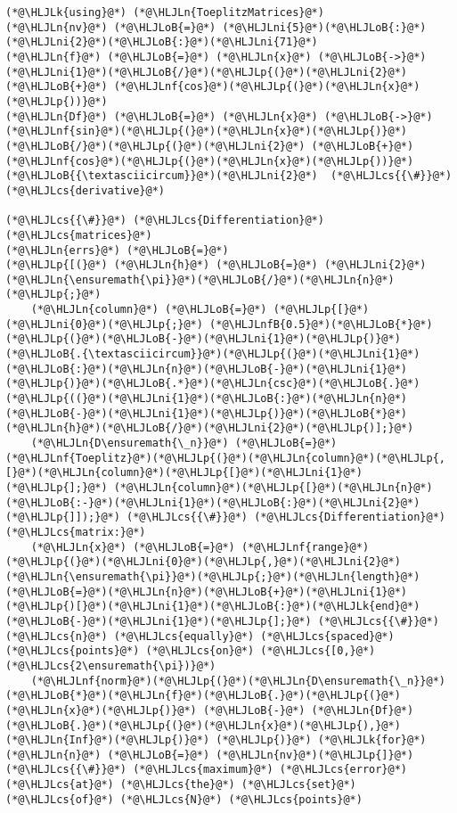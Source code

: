 \documentclass[12pt,a4paper]{article}
\newcommand{\HLJLk}[1]{\textcolor[RGB]{148,91,176}{\textbf{#1}}}
\newcommand{\HLJLn}[1]{#1}
\newcommand{\HLJLnf}[1]{\textcolor[RGB]{66,102,213}{#1}}
\newcommand{\HLJLnfB}[1]{\textcolor[RGB]{59,151,46}{#1}}
\newcommand{\HLJLni}[1]{\textcolor[RGB]{59,151,46}{#1}}
\newcommand{\HLJLoB}[1]{\textcolor[RGB]{102,102,102}{\textbf{#1}}}
\newcommand{\HLJLp}[1]{#1}
\newcommand{\HLJLcs}[1]{\textcolor[RGB]{153,153,119}{\textit{#1}}}
\begin{document}
\begin{lstlisting}
(*@\HLJLk{using}@*) (*@\HLJLn{ToeplitzMatrices}@*)
(*@\HLJLn{nv}@*) (*@\HLJLoB{=}@*) (*@\HLJLni{5}@*)(*@\HLJLoB{:}@*)(*@\HLJLni{2}@*)(*@\HLJLoB{:}@*)(*@\HLJLni{71}@*)
(*@\HLJLn{f}@*) (*@\HLJLoB{=}@*) (*@\HLJLn{x}@*) (*@\HLJLoB{->}@*) (*@\HLJLni{1}@*)(*@\HLJLoB{/}@*)(*@\HLJLp{(}@*)(*@\HLJLni{2}@*) (*@\HLJLoB{+}@*) (*@\HLJLnf{cos}@*)(*@\HLJLp{(}@*)(*@\HLJLn{x}@*)(*@\HLJLp{))}@*)
(*@\HLJLn{Df}@*) (*@\HLJLoB{=}@*) (*@\HLJLn{x}@*) (*@\HLJLoB{->}@*) (*@\HLJLnf{sin}@*)(*@\HLJLp{(}@*)(*@\HLJLn{x}@*)(*@\HLJLp{)}@*)(*@\HLJLoB{/}@*)(*@\HLJLp{(}@*)(*@\HLJLni{2}@*) (*@\HLJLoB{+}@*) (*@\HLJLnf{cos}@*)(*@\HLJLp{(}@*)(*@\HLJLn{x}@*)(*@\HLJLp{))}@*)(*@\HLJLoB{{\textasciicircum}}@*)(*@\HLJLni{2}@*)  (*@\HLJLcs{{\#}}@*) (*@\HLJLcs{derivative}@*)

(*@\HLJLcs{{\#}}@*) (*@\HLJLcs{Differentiation}@*) (*@\HLJLcs{matrices}@*)
(*@\HLJLn{errs}@*) (*@\HLJLoB{=}@*) 
(*@\HLJLp{[(}@*) (*@\HLJLn{h}@*) (*@\HLJLoB{=}@*) (*@\HLJLni{2}@*)(*@\HLJLn{\ensuremath{\pi}}@*)(*@\HLJLoB{/}@*)(*@\HLJLn{n}@*)(*@\HLJLp{;}@*)
    (*@\HLJLn{column}@*) (*@\HLJLoB{=}@*) (*@\HLJLp{[}@*)(*@\HLJLni{0}@*)(*@\HLJLp{;}@*) (*@\HLJLnfB{0.5}@*)(*@\HLJLoB{*}@*)(*@\HLJLp{(}@*)(*@\HLJLoB{-}@*)(*@\HLJLni{1}@*)(*@\HLJLp{)}@*)(*@\HLJLoB{.{\textasciicircum}}@*)(*@\HLJLp{(}@*)(*@\HLJLni{1}@*)(*@\HLJLoB{:}@*)(*@\HLJLn{n}@*)(*@\HLJLoB{-}@*)(*@\HLJLni{1}@*)(*@\HLJLp{)}@*)(*@\HLJLoB{.*}@*)(*@\HLJLn{csc}@*)(*@\HLJLoB{.}@*)(*@\HLJLp{((}@*)(*@\HLJLni{1}@*)(*@\HLJLoB{:}@*)(*@\HLJLn{n}@*)(*@\HLJLoB{-}@*)(*@\HLJLni{1}@*)(*@\HLJLp{)}@*)(*@\HLJLoB{*}@*)(*@\HLJLn{h}@*)(*@\HLJLoB{/}@*)(*@\HLJLni{2}@*)(*@\HLJLp{)];}@*)
    (*@\HLJLn{D\ensuremath{\_n}}@*) (*@\HLJLoB{=}@*) (*@\HLJLnf{Toeplitz}@*)(*@\HLJLp{(}@*)(*@\HLJLn{column}@*)(*@\HLJLp{,[}@*)(*@\HLJLn{column}@*)(*@\HLJLp{[}@*)(*@\HLJLni{1}@*)(*@\HLJLp{];}@*) (*@\HLJLn{column}@*)(*@\HLJLp{[}@*)(*@\HLJLn{n}@*)(*@\HLJLoB{:-}@*)(*@\HLJLni{1}@*)(*@\HLJLoB{:}@*)(*@\HLJLni{2}@*)(*@\HLJLp{]]);}@*) (*@\HLJLcs{{\#}}@*) (*@\HLJLcs{Differentiation}@*) (*@\HLJLcs{matrix:}@*)
    (*@\HLJLn{x}@*) (*@\HLJLoB{=}@*) (*@\HLJLnf{range}@*)(*@\HLJLp{(}@*)(*@\HLJLni{0}@*)(*@\HLJLp{,}@*)(*@\HLJLni{2}@*)(*@\HLJLn{\ensuremath{\pi}}@*)(*@\HLJLp{;}@*)(*@\HLJLn{length}@*)(*@\HLJLoB{=}@*)(*@\HLJLn{n}@*)(*@\HLJLoB{+}@*)(*@\HLJLni{1}@*)(*@\HLJLp{)[}@*)(*@\HLJLni{1}@*)(*@\HLJLoB{:}@*)(*@\HLJLk{end}@*)(*@\HLJLoB{-}@*)(*@\HLJLni{1}@*)(*@\HLJLp{];}@*) (*@\HLJLcs{{\#}}@*) (*@\HLJLcs{n}@*) (*@\HLJLcs{equally}@*) (*@\HLJLcs{spaced}@*) (*@\HLJLcs{points}@*) (*@\HLJLcs{on}@*) (*@\HLJLcs{[0,}@*) (*@\HLJLcs{2\ensuremath{\pi})}@*)
    (*@\HLJLnf{norm}@*)(*@\HLJLp{(}@*)(*@\HLJLn{D\ensuremath{\_n}}@*)(*@\HLJLoB{*}@*)(*@\HLJLn{f}@*)(*@\HLJLoB{.}@*)(*@\HLJLp{(}@*)(*@\HLJLn{x}@*)(*@\HLJLp{)}@*) (*@\HLJLoB{-}@*) (*@\HLJLn{Df}@*)(*@\HLJLoB{.}@*)(*@\HLJLp{(}@*)(*@\HLJLn{x}@*)(*@\HLJLp{),}@*)(*@\HLJLn{Inf}@*)(*@\HLJLp{)}@*) (*@\HLJLp{)}@*) (*@\HLJLk{for}@*) (*@\HLJLn{n}@*) (*@\HLJLoB{=}@*) (*@\HLJLn{nv}@*)(*@\HLJLp{]}@*) (*@\HLJLcs{{\#}}@*) (*@\HLJLcs{maximum}@*) (*@\HLJLcs{error}@*) (*@\HLJLcs{at}@*) (*@\HLJLcs{the}@*) (*@\HLJLcs{set}@*) (*@\HLJLcs{of}@*) (*@\HLJLcs{N}@*) (*@\HLJLcs{points}@*)


\end{lstlisting}
\end{document}

